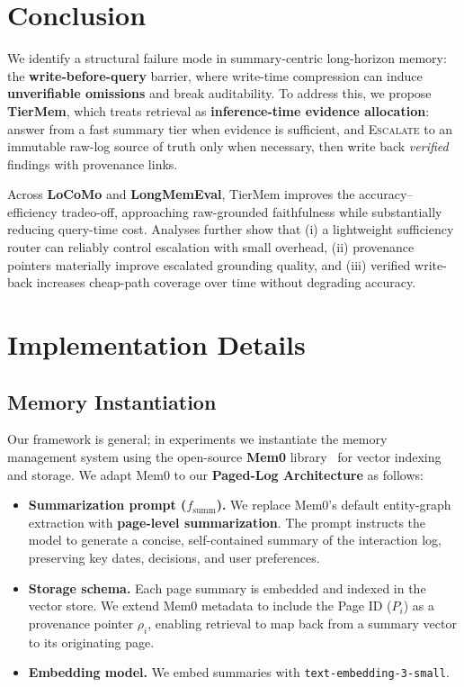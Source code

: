 \documentclass{article}
\theoremstyle{plain}
\theoremstyle{definition}
\theoremstyle{remark}
\begin{document}
\section{Conclusion}
\label{sec:conclusion}

We identify a structural failure mode in summary-centric long-horizon memory: the \textbf{write-before-query} barrier, where write-time compression can induce \textbf{unverifiable omissions} and break auditability.
To address this, we propose \textbf{TierMem}, which treats retrieval as \textbf{inference-time evidence allocation}: answer from a fast summary tier when evidence is sufficient, and \textsc{Escalate} to an immutable raw-log source of truth only when necessary, then write back \emph{verified} findings with provenance links.

Across \textbf{LoCoMo} and \textbf{LongMemEval}, TierMem improves the accuracy--efficiency tradeo-off, approaching raw-grounded faithfulness while substantially reducing query-time cost.
Analyses further show that (i) a lightweight sufficiency router can reliably control escalation with small overhead, (ii) provenance pointers materially improve escalated grounding quality, and (iii) verified write-back increases cheap-path coverage over time without degrading accuracy.




\appendix
\section{Implementation Details}
\label{app:impl_details}

\subsection{Memory Instantiation}
Our framework is general; in experiments we instantiate the memory management system using the open-source \textbf{Mem0} library~\cite{chhikara_mem0_2025} for vector indexing and storage. We adapt Mem0 to our \textbf{Paged-Log Architecture} as follows:
\begin{itemize}
    \item \textbf{Summarization prompt ($f_{\text{summ}}$).}
    We replace Mem0's default entity-graph extraction with \textbf{page-level summarization}. The prompt instructs the model to generate a concise, self-contained summary of the interaction log, preserving key dates, decisions, and user preferences.

    \item \textbf{Storage schema.}
    Each page summary is embedded and indexed in the vector store. We extend Mem0 metadata to include the Page ID ($P_i$) as a provenance pointer $\rho_i$, enabling retrieval to map back from a summary vector to its originating page.

    \item \textbf{Embedding model.}
    We embed summaries with \texttt{text-embedding-3-small}.
\end{itemize}
\end{document}

